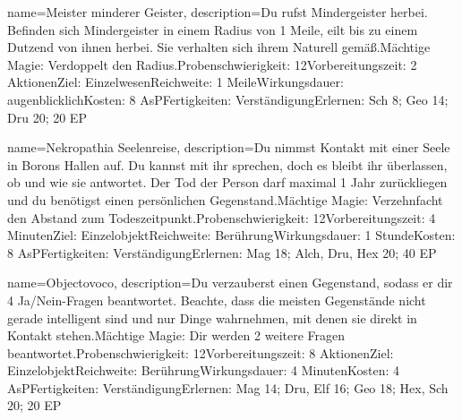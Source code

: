 {
    name={Meister minderer Geister},
    description={Du rufst Mindergeister herbei. Befinden sich Mindergeister in einem Radius von 1 Meile, eilt bis zu einem Dutzend von ihnen herbei. Sie verhalten sich ihrem Naturell gemäß.\newline Mächtige Magie: Verdoppelt den Radius.\newline Probenschwierigkeit: 12\newline Vorbereitungszeit: 2 Aktionen\newline Ziel: Einzelwesen\newline Reichweite: 1 Meile\newline Wirkungsdauer: augenblicklich\newline Kosten: 8 AsP\newline Fertigkeiten: Verständigung\newline Erlernen: Sch 8; Geo 14; Dru 20; 20 EP}
}


{
    name={Nekropathia Seelenreise},
    description={Du nimmst Kontakt mit einer Seele in Borons Hallen auf. Du kannst mit ihr sprechen, doch es bleibt ihr überlassen, ob und wie sie antwortet. Der Tod der Person darf maximal 1 Jahr zurückliegen und du benötigst einen persönlichen Gegenstand.\newline Mächtige Magie: Verzehnfacht den Abstand zum Todeszeitpunkt.\newline Probenschwierigkeit: 12\newline Vorbereitungszeit: 4 Minuten\newline Ziel: Einzelobjekt\newline Reichweite: Berührung\newline Wirkungsdauer: 1 Stunde\newline Kosten: 8 AsP\newline Fertigkeiten: Verständigung\newline Erlernen: Mag 18; Alch, Dru, Hex 20; 40 EP}
}


{
    name={Objectovoco},
    description={Du verzauberst einen Gegenstand, sodass er dir 4 Ja/Nein-Fragen beantwortet. Beachte, dass die meisten Gegenstände nicht gerade intelligent sind und nur Dinge wahrnehmen, mit denen sie direkt in Kontakt stehen.\newline Mächtige Magie: Dir werden 2 weitere Fragen beantwortet.\newline Probenschwierigkeit: 12\newline Vorbereitungszeit: 8 Aktionen\newline Ziel: Einzelobjekt\newline Reichweite: Berührung\newline Wirkungsdauer: 4 Minuten\newline Kosten: 4 AsP\newline Fertigkeiten: Verständigung\newline Erlernen: Mag 14; Dru, Elf 16; Geo 18; Hex, Sch 20; 20 EP}
}


